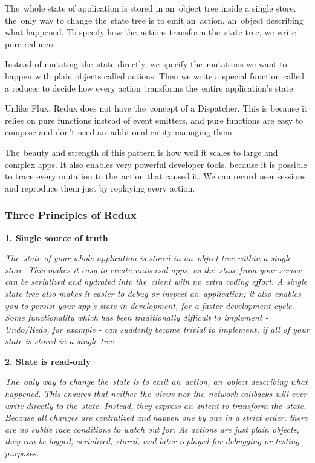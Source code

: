 The~whole state of application is stored in an~object tree inside a single store. the~only way to change the~state tree is to emit an~action, an~object describing what happened. To specify how the~actions transform the~state tree, we write pure reducers.\citep{redux-intro}

Instead of mutating the~state directly, we specify the~mutations we want to happen with plain objects called actions. Then we write a special function called a reducer to decide how every action transforms the~entire application's state.\citep{redux-intro}

Unlike Flux, Redux does not have the~concept of a Dispatcher. This is because it relies on pure functions instead of event emitters, and pure functions are easy to compose and don't need an~additional entity managing them.

The~beauty and strength of this pattern is how well it scales to large and complex apps. It also enables very powerful developer tools, because it is possible to trace every mutation to the~action that caused it. We can record user sessions and reproduce them just by replaying every action.\citep{redux-intro}

\subsubsection{Three Principles of Redux}
\textbf{1. Single source of truth}

\textsl{The~state of your whole application is stored in an~object tree within a single store. This makes it easy to create universal apps, as the~state from your server can be serialized and hydrated into the~client with no extra coding effort. A single state tree also makes it easier to debug or inspect an~application; it also enables you to persist your app's state in development, for a faster development cycle. Some functionality which has been traditionally difficult to implement - Undo/Redo, for example - can suddenly become trivial to implement, if all of your state is stored in a single tree.} \citep{redux-intro}

\textbf{2. State is read-only}

\textsl{The~only way to change the~state is to emit an~action, an~object describing what happened. This ensures that neither the~views nor the~network callbacks will ever write directly to the~state. Instead, they express an~intent to transform the~state. Because all changes are centralized and happen one by one in a strict order, there are no subtle race conditions to watch out for. As actions are just plain objects, they can be logged, serialized, stored, and later replayed for debugging or testing purposes.} \citep{redux-intro}

